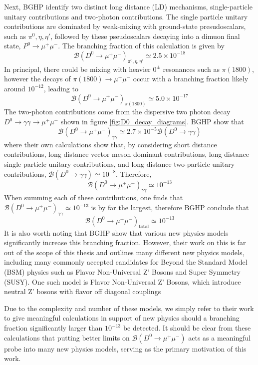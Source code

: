 Next, BGHP identify two distinct long distance (LD) mechanisms, single-particle unitary contributions and two-photon contributions. The single particle unitary contributions are dominated by weak-mixing with ground-state presudoscalars, such as $\pi^0, \eta, \eta'$, followed by these pseudoscalars decaying into a dimuon final state, $P^0 \to \mu^+ \mu^-$. The branching fraction of this calculation is given by
\begin{equation}
\mathcal{B}(D^0 \to \mu^+ \mu^-)_{\pi^0, \eta, \eta'} \simeq 2.5 \times 10^{-18}
\end{equation}
In principal, there could be mixing with heavier $0^\pm$ resonances such as $\pi(1800)$, however the decays of $\pi(1800) \to \mu^+\mu^-$ occur with a branching fraction likely around $10^{-12}$, leading to
\begin{equation}
\mathcal{B}(D^0 \to \mu^+ \mu^-)_{\pi(1800)} \simeq  5.0 \times 10^{-17}
\end{equation}
The two-photon contributions come from the dispersive two photon decay $D^0 \to \gamma \gamma \to \mu^+ \mu^-$ shown in figure \ref{fig:D0_decay_diagrams}. BGHP show that 
\begin{equation}
\mathcal{B}(D^0 \to \mu^+ \mu^-)_{\gamma\gamma} \simeq 2.7 \times 10^{-5} \mathcal{B}(D^0 \to \gamma\gamma)
\end{equation}
where their own calculations show that, by considering short distance contributions, long distance vector meson dominant contributions, long distance single particle unitary contributions, and long distance two-particle unitary contributions, $\mathcal{B}(D^0 \to \gamma\gamma) \simeq 10^{-8}$. Therefore, 
\begin{equation}
\mathcal{B}(D^0 \to \mu^+ \mu^-)_{\gamma\gamma} \simeq 10^{-13}
\end{equation}
When summing each of these contributions, one finds that $\mathcal{B}(D^0 \to \mu^+ \mu^-)_{\gamma\gamma} \simeq 10^{-13}$ is by far the largest, therefore BGHP conclude that
\begin{equation}
\mathcal{B}(D^0 \to \mu^+ \mu^-)_{\text{total}} \simeq 10^{-13}
\end{equation}
It is also worth noting that BGHP show that various new physics models significantly increase this branching fraction. However, their work on this is far out of the scope of this thesis and outlines many different new physics models, including many commonly accepted candidates for Beyond the Standard Model (BSM) physics such as Flavor Non-Universal Z' Bosons and Super Symmetry (SUSY). One such model is Flavor Non-Universal Z' Bosons, which introduce neutral Z' bosons with flavor off diagonal couplings 

Due to the complexity and number of these models, we simply refer to their work to give meaningful calculations in support of new physics should a branching fraction significantly larger than $10^{-13}$ be detected. It should be clear from these calculations that putting better limits on $\mathcal{B}(D^0 \to \mu^+ \mu^-)$ acts as a meaningful probe into many new physics models, serving as the primary motivation of this work. 